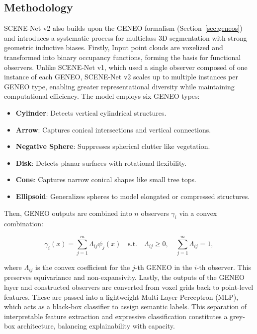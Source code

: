 \subsection{Methodology}

SCENE-Net v2 also builds upon the GENEO formalism (Section~\ref{sec:geneos})
and introduces a systematic process for multiclass 3D segmentation with strong
geometric inductive biases.
%
Firstly, Input point clouds are voxelized and transformed into binary occupancy
functions, forming the basis for functional observers.
%
Unlike SCENE-Net v1, which used a single observer composed of one instance of
each GENEO, SCENE-Net v2 scales up to multiple instances per GENEO type,
enabling greater representational diversity while maintaining computational
efficiency. The model employs six GENEO types:
\begin{itemize}
      \item \textbf{Cylinder}: Detects vertical cylindrical structures.
      \item \textbf{Arrow}: Captures conical intersections and vertical connections.
      \item \textbf{Negative Sphere}: Suppresses spherical clutter like vegetation.
      \item \textbf{Disk}: Detects planar surfaces with rotational flexibility.
      \item \textbf{Cone}: Captures narrow conical shapes like small tree tops.
      \item \textbf{Ellipsoid}: Generalizes spheres to model elongated or compressed structures.
\end{itemize}
%
Then, GENEO outputs are combined into $n$ observers $\gamma_i$ via a convex
combination:

\begin{equation}
      \gamma_i(x) = \sum_{j=1}^m \Lambda_{ij} \psi_j(x) \quad \text{s.t.} \quad \Lambda_{ij} \geq 0, \quad \sum_{j=1}^m \Lambda_{ij} = 1,
\end{equation}

where $\Lambda_{ij}$ is the convex coefficient for the $j$-th GENEO in the
$i$-th observer. This preserves equivariance and non-expansivity.
%
Lastly, the outputs of the GENEO layer and constructed observers are converted
from voxel grids back to point-level features. These are passed into a
lightweight Multi-Layer Perceptron (MLP), which acts as a black-box classifier
to assign semantic labels. This separation of interpretable feature extraction
and expressive classification constitutes a grey-box architecture, balancing
explainability with capacity.

